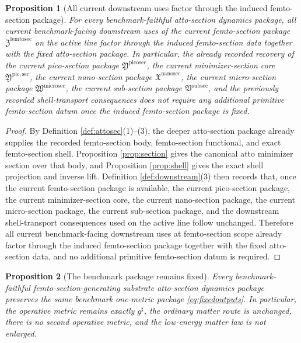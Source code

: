 \documentclass[11pt]{article}
\newcommand{\CompletedMetric}{g^{\sharp}}
\newcommand{\SubSectionPackage}{\mathfrak V^{\mathrm{subsec}}}
\newcommand{\MicroSectionPackage}{\mathfrak W^{\mathrm{microsec}}}
\newcommand{\NanoSectionPackage}{\mathfrak X^{\mathrm{nanosec}}}
\newcommand{\PicoSectionPackage}{\mathfrak Y^{\mathrm{picosec}}}
\newcommand{\PicoMinSectionCore}{\mathfrak Y^{\mathrm{pic,sec}}}
\newcommand{\FemtoSectionPackage}{\mathfrak Z^{\mathrm{femtosec}}}
\newtheorem{proposition}{Proposition}
\begin{document}
\begin{proposition}[All current downstream uses factor through the induced femto-section package]
\label{prop:downstream}
For every benchmark-faithful atto-section dynamics package, all current benchmark-facing downstream uses of the current femto-section package \(\FemtoSectionPackage\) on the active line factor through the induced femto-section data together with the fixed atto-section package. In particular, the already recorded recovery of the current pico-section package \(\PicoSectionPackage\), the current minimizer-section core \(\PicoMinSectionCore\), the current nano-section package \(\NanoSectionPackage\), the current micro-section package \(\MicroSectionPackage\), the current sub-section package \(\SubSectionPackage\), and the previously recorded shell-transport consequences does not require any additional primitive femto-section datum once the induced femto-section package is fixed.
\end{proposition}

\begin{proof}
By Definition \ref{def:attosec}(1)--(3), the deeper atto-section package already supplies the recorded femto-section body, femto-section functional, and exact femto-section shell. Proposition \ref{prop:section} gives the canonical atto minimizer section over that body, and Proposition \ref{prop:shell} gives the exact shell projection and inverse lift. Definition \ref{def:downstream}(3) then records that, once the current femto-section package is available, the current pico-section package, the current minimizer-section core, the current nano-section package, the current micro-section package, the current sub-section package, and the downstream shell-transport consequences used on the active line follow unchanged. Therefore all current benchmark-facing downstream uses at femto-section scope already factor through the induced femto-section package together with the fixed atto-section data, and no additional primitive femto-section datum is required.
\end{proof}

\begin{proposition}[The benchmark package remains fixed]
\label{prop:benchmark}
Every benchmark-faithful femto-section-generating substrate atto-section dynamics package preserves the same benchmark one-metric package \eqref{eq:fixedoutputs}. In particular, the operative metric remains exactly \(\CompletedMetric\), the ordinary matter route is unchanged, there is no second operative metric, and the low-energy matter law is not enlarged.
\end{proposition}
\end{document}
